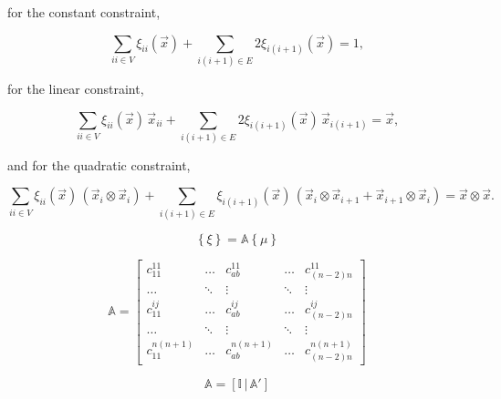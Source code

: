 for the constant constraint,

\begin{equation}
\label{eq::BF_ser_interp_req_constant_alt}
\sum_{ii \in V}  \xi_{ii} (\vec{x}) + \sum_{i(i+1) \in E} 2 \xi_{i(i+1)} (\vec{x})  = 1 ,
\end{equation}

\noindent for the linear constraint,

\begin{equation}
\label{eq::BF_ser_interp_req_linear_alt}
\sum_{ii \in V}  \xi_{ii} (\vec{x}) \, \vec{x}_{ii} +  \sum_{i(i+1) \in E} 2  \xi_{i(i+1)} (\vec{x}) \, \vec{x}_{i(i+1)} = \vec{x} ,
\end{equation}

\noindent and for the quadratic constraint,

\begin{equation}
\label{eq::BF_ser_interp_req_quadratic_alt}
\sum_{ii \in V}  \xi_{ii} (\vec{x}) \, \left( \vec{x}_i \otimes \vec{x}_i \right) +  \sum_{i(i+1) \in E}   \xi_{i(i+1)} (\vec{x}) \, \left( \vec{x}_i \otimes \vec{x}_{i+1} + \vec{x}_{i+1} \otimes \vec{x}_i \right)   =  \vec{x} \otimes \vec{x} .
\end{equation}



\begin{equation}
\label{eq::BF_quad_to_ser_mapping}
\left\{ \xi \right\} = \mathbb{A} \left\{ \mu \right\}
\end{equation}

\begin{equation}
\label{eq::BF_quad_to_ser_matrix_constraints}
\mathbb{A} = 
\left[
\begin{array}{ccccc}
c_{11}^{11} & \ldots & c_{ab}^{11} & \ldots & c_{(n-2)n}^{11} \\
\ldots&\ddots&\vdots&\ddots&\vdots \\
c_{11}^{ij} & \ldots & c_{ab}^{ij} & \ldots & c_{(n-2)n}^{ij} \\
\ldots&\ddots&\vdots&\ddots&\vdots \\
c_{11}^{n(n+1)} & \ldots & c_{ab}^{n(n+1)} & \ldots & c_{(n-2)n}^{n(n+1)} 
\end{array}
\right]
\end{equation}


\begin{equation}
\label{eq::BF_quad_Amat_simple}
\mathbb{A} = \left[ \mathbb{I} \, | \, \mathbb{A}' \right]
\end{equation}


